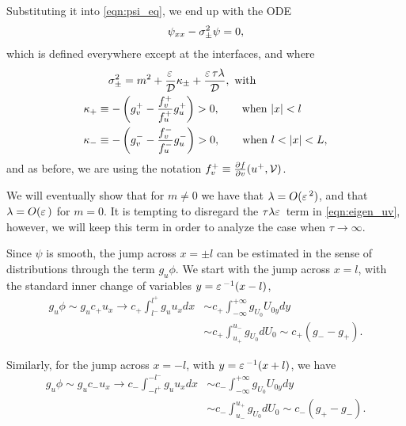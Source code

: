 Substituting it into \eqref{eqn:psi_eq}, we end up with the ODE
% 
\begin{equation}
\label{eqn:psi_aprox}
\begin{split}
	\psi_{xx} - \sI_{\pm}^2\psi = 0,
\end{split}
\end{equation}
% 
which is defined everywhere except at the interfaces, and where
% 
\begin{equation}
\label{eqn:sigma}
\begin{split}
	&\quad\sI_{\pm}^2 = m^2  + \frac{\Ep}{\DD}\kA_{\pm} + \frac{\Ep\tau\lA}{\DD}, \text{ with}\\
	\kA_+ &\equiv - \left(g_v^+ - \frac{f_v^+}{f_u^+}g_u^+ \right)>0,\qquad \text{when }|x|<l \\
	\kA_- &\equiv - \left(g_v^- - \frac{f_v^-}{f_u^-}g_u^- \right)>0,\qquad \text{when }l<|x|<L,
\end{split}
\end{equation}
% 
and as before, we are using the notation $f_v^+\equiv \pAr vf(u^+,\VV)$.

\begin{remark}
	We will eventually show that for $m\neq0$ we have that $\lA=O(\Ep^2)$, and that $\lA=O(\Ep)$ for $m=0$. It is tempting to disregard the $\tau\lA\Ep$ term in \eqref{eqn:eigen_uv}, however, we will keep this term in order to analyze the case when $\tau\rightarrow\infty$.
\end{remark}

Since $\psi$ is smooth, the jump across $x=\pm l$ can be estimated in the sense of distributions through the term $g_u\phi$. We start with the jump across $x=l$, with the standard inner change of variables $y=\Ep^{-1}(x-l)$,
% 
\begin{equation}
\label{eqn:phi_aprox1}
\begin{split}
	g_u\phi\sim g_u c_+u_x\rightarrow c_+\int_{l^-}^{l^+}g_uu_xdx 
	&\sim c_+\int_{-\infty}^{+\infty}g_{U_0}U_{0y}dy \\
	&\sim c_+\int_{u_+}^{u_-}g_{U_0}dU_0\sim c_+(g_- - g_+).
\end{split}
\end{equation}
% 

Similarly, for the jump across $x=-l$, with $y=\Ep^{-1}(x+l)$, we have
% 
\begin{equation}
\label{eqn:phi_aprox2}
\begin{split}
	g_u\phi\sim g_u c_-u_x\rightarrow c_-\int_{-l^+}^{-l^-}g_uu_xdx 
	&\sim c_-\int_{-\infty}^{+\infty}g_{U_0}U_{0y}dy \\
	&\sim c_-\int_{u_-}^{u_+}g_{U_0}dU_0\sim c_-(g_+ - g_-).
\end{split}
\end{equation}
% 

